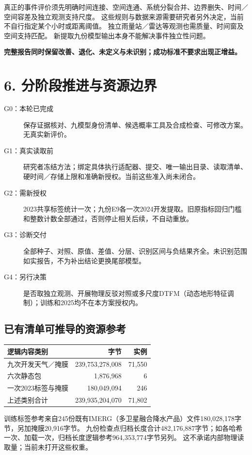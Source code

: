 \documentclass[UTF8,a4paper,10pt,fontset=none]{ctexart}
\newcommand{\key}[1]{\textcolor{ink}{\textbf{#1}}}
\newcommand{\code}[1]{{\small\texttt{\detokenize{#1}}}}
\begin{document}
真正的事件评价须先明确时间连接、空间连通、系统分裂合并、边界删失、时间／空间容差及独立观测支持尺度。
这些规则与数据来源需要研究者另外决定，当前不自行指定某个小时或距离阈值。
独立雨量站／雷达等观测也需质量、时间窗及空间支持匹配。
新提取九份模型输出本身不能解决事件独立性问题。

\key{完整报告同时保留改善、退化、未定义与未识别；成功标准不要求出现正增益。}

\newpage
\section*{6. 分阶段推进与资源边界}
\begin{description}
\item[G0：本轮已完成] 保存证据核对、九模型身份清单、候选概率工具及合成检查、可修改方案。无真实新评价。
\item[G1：真实读取前] 研究者冻结方法；绑定具体执行适配器、提交、唯一输出目录、读取清单、硬时间／存储上限和准确新授权。当前这些准入尚未闭合。
\item[G2：需新授权] 2023共享标签统计一次；九份E9各一次2024开发提取。旧原指标回归门槛和整数计数全部通过，否则停止相关后续，不自动重放。
\item[G3：诊断交付] 全部种子、对照、原值、差值、分层、识别区间与负结果齐全。未识别范围如实报告，不为补出结论更换尾部模型。
\item[G4：另行决策] 是否取独立观测、开展物理反驳对照或多尺度DTFM（动态地形特征调制）；训练和2025均不在本方案授权内。
\end{description}

\subsection*{已有清单可推导的资源参考}
\begin{center}\small
\begin{tabularx}{\linewidth}{@{}Xrr@{}}
\toprule
逻辑内容类别 & 字节 & 实例\\
\midrule
九次开发天气／掩膜 & 239,753,278,008 & 71,550\\
六次静态包 & 1,876,968 & 6\\
一次2023标签与掩膜 & 180,049,094 & 246\\
\midrule
上述类别合计 & 239,935,204,070 & 71,802\\
\bottomrule
\end{tabularx}
\end{center}
训练标签参考来自245份既有IMERG（多卫星融合降水产品）文件180,028,178字节，另加掩膜20,916字节。
九份检查点归档长度合计482,176,887字节；如各哈希一次、加载一次，归档长度逻辑参考964,353,774字节另列。
这不承诺\code{torch/zip}内部物理读取量；当前未打开这些权重。
\end{document}
